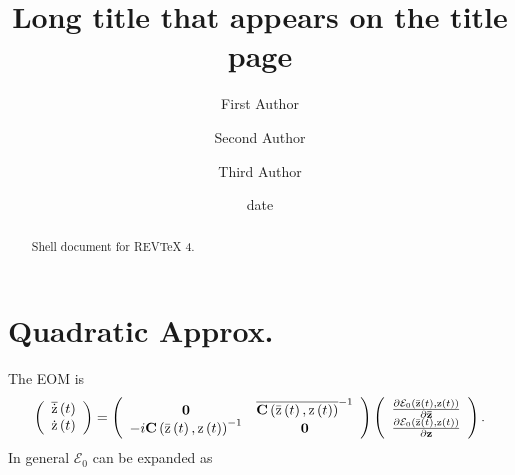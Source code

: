 \documentclass[aps,preprint]{revtex4}%
\begin{document}
\title[Short title for running header]{Long title that appears on the title page}
\author{First Author}
\author{Second Author}
\author{Third Author}

\begin{abstract}
Shell document for REV\TeX{} 4.

\end{abstract}
\date[Date text]{date}




\maketitle
\tableofcontents


\section{Quadratic Approx.}

The EOM is
\begin{equation}
\left(
\begin{array}
[c]{c}%
\overline{\mathrm{\dot{z}}}\left(  t\right)  \\
\mathrm{\dot{z}}\left(  t\right)
\end{array}
\right)  =\left(
\begin{array}
[c]{cc}%
\mathbf{0} & \overline{\mathbf{C}\left(  \mathrm{\bar{z}}\left(  t\right)
,\mathrm{z}\left(  t\right)  \right)  }^{-1}\\
-i\mathbf{C}\left(  \mathrm{\bar{z}}\left(  t\right)  ,\mathrm{z}\left(
t\right)  \right)  ^{-1} & \mathbf{0}%
\end{array}
\right)  \left(
\begin{array}
[c]{c}%
\frac{\partial\mathcal{E}_{0}\left(  \mathrm{\bar{z}}\left(  t\right)
,\mathrm{z}\left(  t\right)  \right)  }{\partial\mathbf{\bar{z}}}\\
\frac{\partial\mathcal{E}_{0}\left(  \mathrm{\bar{z}}\left(  t\right)
,\mathrm{z}\left(  t\right)  \right)  }{\partial\mathbf{z}}%
\end{array}
\right)  .
\end{equation}
In general $\mathcal{E}_{0}$ can be expanded as %
\end{document}
